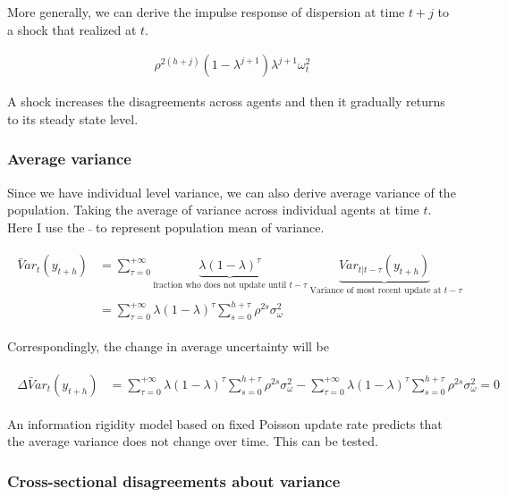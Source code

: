 \documentclass[]{article}
\begin{document}
More generally, we can derive the impulse response of dispersion at time $t+j$ to a shock that realized at $t$. 

\begin{eqnarray}
\rho^{2(h+j)} (1-\lambda^{j+1})\lambda^{j+1} \omega^2_t
\end{eqnarray}


A shock increases the disagreements across agents and then it gradually returns to its steady state level. 

\subsubsection{Average variance}

Since we have individual level variance, we can also derive average variance of the population. Taking the average of variance across individual agents at time $t$. Here I use the $\bar{}$ to represent population mean of variance. 

\begin{eqnarray}
\begin{aligned}
\bar Var_{t}(y_{t+h}) & = \sum^{+\infty}_{\tau =0} \underbrace{\lambda (1-\lambda)^\tau}_{\text{fraction who does not update until }t-\tau} \underbrace{Var_{t|t-\tau}(y_{t+h})}_{\text{ Variance of most recent update at }t-\tau} \\
& = \sum^{+\infty}_{\tau =0} \lambda (1-\lambda)^\tau \sum^{h+\tau}_{s=0}\rho^{2s} \sigma^2_{\omega}
\end{aligned}
\end{eqnarray}

Correspondingly, the change in average uncertainty will be 


\begin{eqnarray}
\begin{aligned}
\Delta \bar Var_{t}(y_{t+h}) & = \sum^{+\infty}_{\tau =0} \lambda (1-\lambda)^\tau \sum^{h+\tau}_{s=0}\rho^{2s} \sigma^2_{\omega} - \sum^{+\infty}_{\tau =0} \lambda (1-\lambda)^\tau \sum^{h+\tau}_{s=0}\rho^{2s} \sigma^2_{\omega} = 0  
\end{aligned}
\end{eqnarray}

An information rigidity model based on fixed Poisson update rate predicts that the average variance does not change over time. This can be tested.

\subsubsection{Cross-sectional disagreements about variance} 
\end{document}

